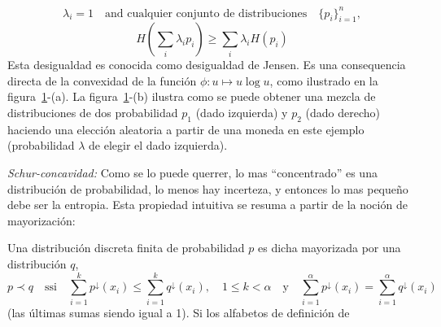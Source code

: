 \begin{propiedades}
\[  \lambda_i = 1  \quad \mbox{and cualquier conjunto de  distribuciones} \quad \{
  p_i \}_{i=1}^n,
  \]
  \[
  H\left(  \sum_i  \lambda_i p_i  \right)  \ge  \sum_i  \lambda_i H(p_i)
  \]
  Esta desigualdad es conocida como  desigualdad de Jensen.  Es una consequencia
  directa de  la convexidad  de la funci\'on  $\phi: u  \mapsto u \log  u$, como
  ilustrado       en       la      figura~\ref{fig:SZ:Concavidad}-(a).        La
  figura~\ref{fig:SZ:Concavidad}-(b) ilustra como se puede obtener una mezcla de
  distribuciones  de  dos probabilidad  $p_1$  (dado  izquierda)  y $p_2$  (dado
  derecho)  haciendo una elecci\'on  aleatoria a  partir de  una moneda  en este
  ejemplo (probabilidad $\lambda$ de elegir el dado izquierda).\newline
  \begin{figure}[h!]
  \begin{center}  \end{center}
  \label{fig:SZ:Concavidad}
  \end{figure}
%
\item\label{prop:SZ:Schurconcavidad}  {\it Schur-concavidad:}  Como se  lo puede
  querrer,  lo mas  ``concentrado'' es  una distribuci\'on  de  probabilidad, lo
  menos hay  incerteza, y entonces lo  mas peque\~no debe ser  la entropia. Esta
  propiedad intuitiva se resuma a partir de la noci\'on de mayorizaci\'on:
  \begin{definicion}[Mayorizaci\'on]\label{def:SZ:Mayorizacion}
    Una distribuci\'on  discreta finita de probabilidad $p$  es dicha mayorizada
    por una distribuci\'on $q$,
    \[
    p  \prec  q  \quad   \mbox{ssi}  \quad  \sum_{i=1}^k  p^\downarrow(x_i)  \le
    \sum_{i=1}^k q^\downarrow(x_i), \quad 1 \le  k < \alpha \quad \mbox{y} \quad
    \sum_{i=1}^\alpha p^\downarrow(x_i)  = \sum_{i=1}^\alpha q^\downarrow(x_i)
    \]
    (las \'ultimas sumas siendo igual a 1).  Si los alfabetos de definici\'on de

\end{definicion}
\end{propiedades}
